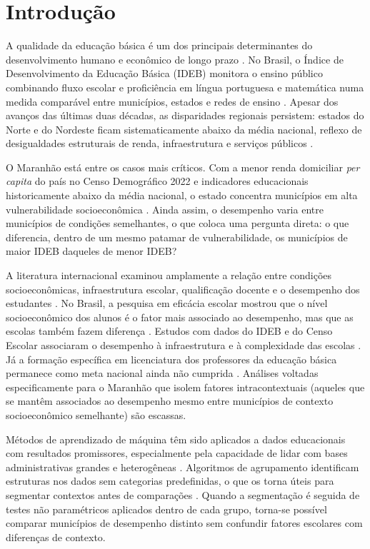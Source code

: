 \section{Introdução}
\label{sec:intro}

A qualidade da educação básica é um dos principais determinantes do desenvolvimento humano e econômico de longo prazo \citep{hanushek2012}. No Brasil, o Índice de Desenvolvimento da Educação Básica (IDEB) monitora o ensino público combinando fluxo escolar e proficiência em língua portuguesa e matemática numa medida comparável entre municípios, estados e redes de ensino \citep{fernandes2007}. Apesar dos avanços das últimas duas décadas, as disparidades regionais persistem: estados do Norte e do Nordeste ficam sistematicamente abaixo da média nacional, reflexo de desigualdades estruturais de renda, infraestrutura e serviços públicos \citep{inep2025}.

O Maranhão está entre os casos mais críticos. Com a menor renda domiciliar \textit{per capita} do país no Censo Demográfico 2022 e indicadores educacionais historicamente abaixo da média nacional, o estado concentra municípios em alta vulnerabilidade socioeconômica \citep{ibge2022, inep2025}. Ainda assim, o desempenho varia entre municípios de condições semelhantes, o que coloca uma pergunta direta: o que diferencia, dentro de um mesmo patamar de vulnerabilidade, os municípios de maior IDEB daqueles de menor IDEB?

A literatura internacional examinou amplamente a relação entre condições socioeconômicas, infraestrutura escolar, qualificação docente e o desempenho dos estudantes \citep{rivkin2005, coleman1966}. No Brasil, a pesquisa em eficácia escolar mostrou que o nível socioeconômico dos alunos é o fator mais associado ao desempenho, mas que as escolas também fazem diferença \citep{brooke2008}. Estudos com dados do IDEB e do Censo Escolar associaram o desempenho à infraestrutura e à complexidade das escolas \citep{alves2013, vasconcelos2021}. Já a formação específica em licenciatura dos professores da educação básica permanece como meta nacional ainda não cumprida \citep{brasil2014, gatti2019}. Análises voltadas especificamente para o Maranhão que isolem fatores intracontextuais (aqueles que se mantêm associados ao desempenho mesmo entre municípios de contexto socioeconômico semelhante) são escassas.

Métodos de aprendizado de máquina têm sido aplicados a dados educacionais com resultados promissores, especialmente pela capacidade de lidar com bases administrativas grandes e heterogêneas \citep{ersozlu2024, kalita2025, romero2020}. Algoritmos de agrupamento identificam estruturas nos dados sem categorias predefinidas, o que os torna úteis para segmentar contextos antes de comparações \citep{faceli2021, kalita2025}. Quando a segmentação é seguida de testes não paramétricos aplicados dentro de cada grupo, torna-se possível comparar municípios de desempenho distinto sem confundir fatores escolares com diferenças de contexto.

